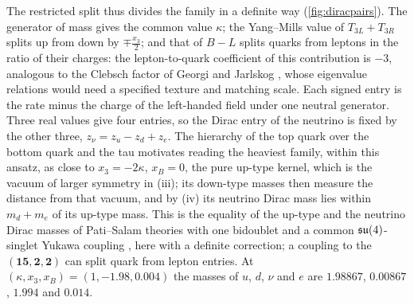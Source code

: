 The restricted split thus divides the family in a definite way (\cref{fig:diracpairs}). The generator of mass gives the common value
$\kappa$; the Yang--Mills value of $T_{3L}+T_{3R}$ splits up from down by $\mp\tfrac{x_3}2$; and that of $B\!-\!L$ splits quarks from leptons
in the ratio of their charges: the lepton-to-quark coefficient of this contribution is $-3$, analogous to the Clebsch factor of Georgi and
Jarlskog \cite{GeorgiJarlskog79}, whose eigenvalue relations would need a specified texture and matching scale. Each signed entry is the rate minus the charge of the left-handed
field under one neutral generator. Three real values give four entries, so the Dirac entry of the neutrino is fixed by the other three,
$z_\nu=z_u-z_d+z_e$. The hierarchy of the top quark over the bottom quark and the tau motivates reading the heaviest family, within this
ansatz, as close to $x_3=-2\kappa$, $x_B=0$, the pure up-type kernel, which is the vacuum of larger symmetry in (iii); its down-type masses
then measure the distance from that vacuum, and by (iv) its neutrino Dirac mass lies within $m_d+m_e$ of its up-type mass. This is the
equality of the up-type and the neutrino Dirac masses of Pati--Salam theories with one bidoublet and a common $\mathfrak{su}(4)$-singlet Yukawa coupling
\cite{PatiSalam,MohapatraSenjanovic80}, here with a definite correction; a coupling to the $(\mathbf{15},\mathbf2,\mathbf2)$ can split quark
from lepton entries. At $(\kappa,x_3,x_B)=(1,-1.98,0.004)$ the masses of $u$, $d$, $\nu$ and $e$ are $1.98867$, $0.00867$,
$1.994$ and $0.014$.


